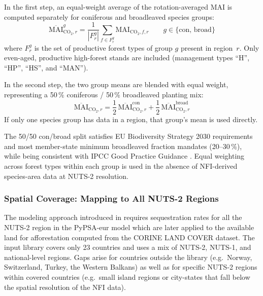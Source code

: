 \documentclass[12pt, a4paper]{article}
\begin{document}
In the first step, an equal-weight average of the rotation-averaged MAI is
computed separately for coniferous and broadleaved species groups:
\begin{equation}
    \overline{\text{MAI}}^{g}_{\text{CO}_2, r}
    = \frac{1}{|F^{g}_r|} \sum_{f \in F^{g}_r} \text{MAI}_{\text{CO}_2, f, r}
    \qquad g \in \{\text{con},\, \text{broad}\}
    \label{eq:nuts2_group}
\end{equation}
where $F^{g}_r$ is the set of productive forest types of group $g$ present in
region~$r$.
Only even-aged, productive high-forest stands are included (management types
``H'', ``HP'', ``HS'', and ``MAN'').

In the second step, the two group means are blended with equal weight,
representing a 50\,\% coniferous / 50\,\% broadleaved planting mix:
\begin{equation}
    \overline{\text{MAI}}_{\text{CO}_2, r}
    = \frac{1}{2}\,\overline{\text{MAI}}^{\text{con}}_{\text{CO}_2, r}
    + \frac{1}{2}\,\overline{\text{MAI}}^{\text{broad}}_{\text{CO}_2, r}
    \label{eq:nuts2_agg}
\end{equation}
If only one species group has data in a region, that group's mean is used
directly.

The 50/50 con/broad split satisfies EU Biodiversity Strategy 2030 requirements
\citep{EC2020BiodiversityStrategy} and most member-state minimum broadleaved
fraction mandates (20--30\,\%), while being consistent with IPCC Good Practice
Guidance \citep{IPCC2006}. Equal weighting across forest types within each group
is used in the absence of NFI-derived species-area data at NUTS-2 resolution.

\subsubsection{Spatial Coverage: Mapping to All NUTS-2 Regions}
\label{sec:affo_nuts2_coverage}

The modeling approach introduced in \cite{Fernandes2026} requires sequestration rates for all the NUTS-2 region in the PyPSA-eur model which are later applied to the available land for afforestation computed from the CORINE LAND COVER dataset. The input library \cite{Pilli2024Zenodo} covers only 23 countries and uses a mix of NUTS-2, NUTS-1, and
national-level regions. Gaps arise for countries outside the library
(e.g.\ Norway, Switzerland, Turkey, the Western Balkans) as well as for
specific NUTS-2 regions within covered countries (e.g.\ small island regions
or city-states that fall below the spatial resolution of the NFI data).
\end{document}
